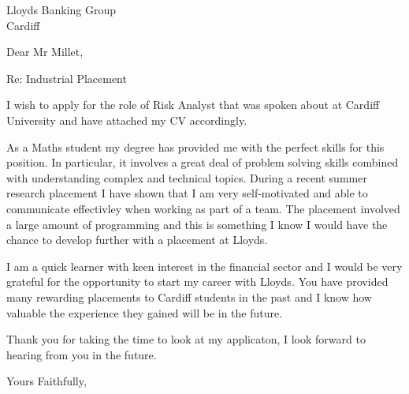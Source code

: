 \documentclass[12pt]{letter}
\begin{document}
\begin{letter}
{Lloyds Banking Group \\ Cardiff}
\opening{Dear Mr Millet,}

Re: Industrial Placement

I wish to apply for the role of Risk Analyst that was spoken about at Cardiff University and have attached my CV accordingly.

As a Maths student my degree has provided me with the perfect skills for this position.
In particular, it involves a great deal of problem solving skills combined with understanding complex and technical topics.
During a recent summer research placement I have shown that I am very self-motivated and able to communicate effectivley when working as part of a team.
The placement involved a large amount of programming and this is something I know I would have the chance to develop further with a placement at Lloyds.

I am a quick learner with keen interest in the financial sector and I would be very grateful for the opportunity to start my career with Lloyds.
You have provided many rewarding placements to Cardiff students in the past and I know how valuable the experience they gained will be in the future.


Thank you for taking the time to look at my applicaton, I look forward to hearing from you in the future.

\closing{Yours Faithfully,}


\end{letter}
\end{document}
